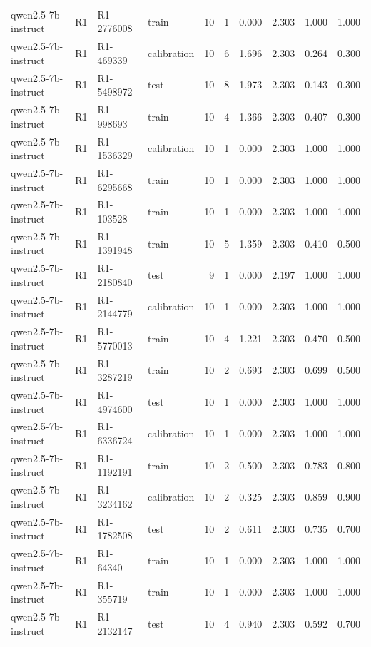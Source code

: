 \begin{table}
\begin{tabular}{llllrrrrrr}
qwen2.5-7b-instruct & R1 & R1-2776008 & train & 10 & 1 & 0.000 & 2.303 & 1.000 & 1.000 \\
qwen2.5-7b-instruct & R1 & R1-469339 & calibration & 10 & 6 & 1.696 & 2.303 & 0.264 & 0.300 \\
qwen2.5-7b-instruct & R1 & R1-5498972 & test & 10 & 8 & 1.973 & 2.303 & 0.143 & 0.300 \\
qwen2.5-7b-instruct & R1 & R1-998693 & train & 10 & 4 & 1.366 & 2.303 & 0.407 & 0.300 \\
qwen2.5-7b-instruct & R1 & R1-1536329 & calibration & 10 & 1 & 0.000 & 2.303 & 1.000 & 1.000 \\
qwen2.5-7b-instruct & R1 & R1-6295668 & train & 10 & 1 & 0.000 & 2.303 & 1.000 & 1.000 \\
qwen2.5-7b-instruct & R1 & R1-103528 & train & 10 & 1 & 0.000 & 2.303 & 1.000 & 1.000 \\
qwen2.5-7b-instruct & R1 & R1-1391948 & train & 10 & 5 & 1.359 & 2.303 & 0.410 & 0.500 \\
qwen2.5-7b-instruct & R1 & R1-2180840 & test & 9 & 1 & 0.000 & 2.197 & 1.000 & 1.000 \\
qwen2.5-7b-instruct & R1 & R1-2144779 & calibration & 10 & 1 & 0.000 & 2.303 & 1.000 & 1.000 \\
qwen2.5-7b-instruct & R1 & R1-5770013 & train & 10 & 4 & 1.221 & 2.303 & 0.470 & 0.500 \\
qwen2.5-7b-instruct & R1 & R1-3287219 & train & 10 & 2 & 0.693 & 2.303 & 0.699 & 0.500 \\
qwen2.5-7b-instruct & R1 & R1-4974600 & test & 10 & 1 & 0.000 & 2.303 & 1.000 & 1.000 \\
qwen2.5-7b-instruct & R1 & R1-6336724 & calibration & 10 & 1 & 0.000 & 2.303 & 1.000 & 1.000 \\
qwen2.5-7b-instruct & R1 & R1-1192191 & train & 10 & 2 & 0.500 & 2.303 & 0.783 & 0.800 \\
qwen2.5-7b-instruct & R1 & R1-3234162 & calibration & 10 & 2 & 0.325 & 2.303 & 0.859 & 0.900 \\
qwen2.5-7b-instruct & R1 & R1-1782508 & test & 10 & 2 & 0.611 & 2.303 & 0.735 & 0.700 \\
qwen2.5-7b-instruct & R1 & R1-64340 & train & 10 & 1 & 0.000 & 2.303 & 1.000 & 1.000 \\
qwen2.5-7b-instruct & R1 & R1-355719 & train & 10 & 1 & 0.000 & 2.303 & 1.000 & 1.000 \\
qwen2.5-7b-instruct & R1 & R1-2132147 & test & 10 & 4 & 0.940 & 2.303 & 0.592 & 0.700 \\

\end{tabular}
\end{table}
